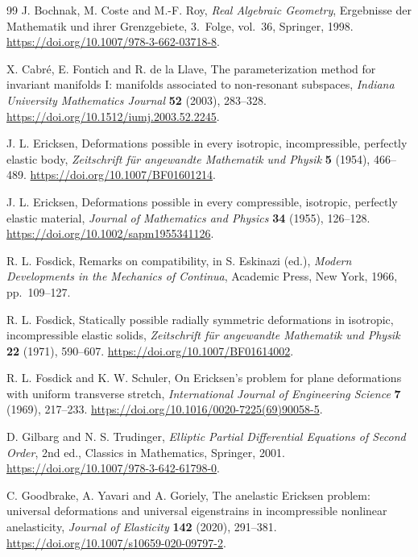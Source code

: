 \documentclass[11pt,a4paper]{article}
\numberwithin{equation}{section}
\theoremstyle{plain}
\theoremstyle{definition}
\theoremstyle{remark}
\begin{document}
{}
\begin{thebibliography}{99}
\small
{}
J. Bochnak, M. Coste and M.-F. Roy,
\emph{Real Algebraic Geometry}, Ergebnisse der Mathematik und ihrer
Grenzgebiete, 3.~Folge, vol.~36, Springer, 1998.
\url{https://doi.org/10.1007/978-3-662-03718-8}.

X. Cabr\'e, E. Fontich and R. de la Llave,
The parameterization method for invariant manifolds I: manifolds
associated to non-resonant subspaces,
\emph{Indiana University Mathematics Journal} \textbf{52} (2003), 283--328.
\url{https://doi.org/10.1512/iumj.2003.52.2245}.

J. L. Ericksen,
Deformations possible in every isotropic, incompressible, perfectly
elastic body,
\emph{Zeitschrift f\"ur angewandte Mathematik und Physik} \textbf{5}
(1954), 466--489.
\url{https://doi.org/10.1007/BF01601214}.

J. L. Ericksen,
Deformations possible in every compressible, isotropic, perfectly elastic
material,
\emph{Journal of Mathematics and Physics} \textbf{34} (1955), 126--128.
\url{https://doi.org/10.1002/sapm1955341126}.

R. L. Fosdick, Remarks on compatibility,
in S. Eskinazi (ed.), \emph{Modern Developments in the Mechanics of Continua},
Academic Press, New York, 1966, pp.~109--127.

R. L. Fosdick,
Statically possible radially symmetric deformations in isotropic,
incompressible elastic solids,
\emph{Zeitschrift f\"ur angewandte Mathematik und Physik} \textbf{22}
(1971), 590--607.
\url{https://doi.org/10.1007/BF01614002}.

R. L. Fosdick and K. W. Schuler,
On Ericksen's problem for plane deformations with uniform transverse stretch,
\emph{International Journal of Engineering Science} \textbf{7}
(1969), 217--233.
\url{https://doi.org/10.1016/0020-7225(69)90058-5}.

D. Gilbarg and N. S. Trudinger,
\emph{Elliptic Partial Differential Equations of Second Order},
2nd ed., Classics in Mathematics, Springer, 2001.
\url{https://doi.org/10.1007/978-3-642-61798-0}.

C. Goodbrake, A. Yavari and A. Goriely,
The anelastic Ericksen problem: universal deformations and universal
eigenstrains in incompressible nonlinear anelasticity,
\emph{Journal of Elasticity} \textbf{142} (2020), 291--381.
\url{https://doi.org/10.1007/s10659-020-09797-2}.


\end{thebibliography}
\end{document}
